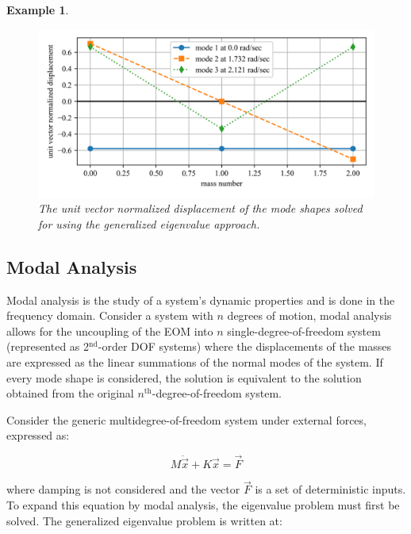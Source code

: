 \documentclass[12pt,letter]{article}
\newtheorem{ex}{Example}
\numberwithin{ex}{section} %
\newenvironment{example}{\begin{mdframed}[middlelinewidth=0.5mm]\begin{ex}\normalfont}{\end{ex}\end{mdframed}}
\numberwithin{re}{section} %
\begin{document}
\begin{example}
\begin{figure}[H]
	\centering
	\includegraphics[width=\linewidth]{../Figures/mode_shape_aiplane_example_generalized_eigenvalue.png}
	\caption{The unit vector normalized displacement of the mode shapes solved for using the generalized eigenvalue approach.}
	\label{fig:mode_shape_aiplane_example_generalized_eigenvalue}
\end{figure}



\end{example}




\subsection{Modal Analysis}

Modal analysis is the study of a system's dynamic properties and is done in the frequency domain. Consider a system with $n$ degrees of motion, modal analysis allows for the uncoupling of the EOM into $n$ single-degree-of-freedom system (represented as 2$^{\text{nd}}$-order DOF systems) where the displacements of the masses are expressed as the linear summations of the normal modes of the system. If every mode shape is considered, the solution is equivalent to the solution obtained from the original $n^{\text{th}}$-degree-of-freedom system. 

Consider the generic multidegree-of-freedom system under external forces, expressed as:


\begin{equation}
M \ddot{\vec{x}} + K\vec{x} = \vec{F}
\end{equation}


\noindent where damping is not considered and the vector $\vec{F}$ is a set of deterministic inputs. To expand this equation by modal analysis, the eigenvalue problem must first be solved. The generalized eigenvalue problem is written at: 
\end{document}
